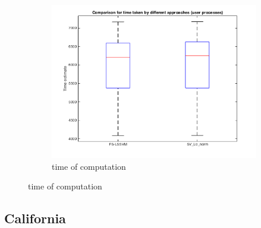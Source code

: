 \documentclass[11pt,oneside,a4paper]{article}
\begin{document}
\begin{figure}[H]
\begin{subfigure}[b]{0.4\textwidth}
		\includegraphics[width=\textwidth]{../Figures/time2}
		\caption{time of computation}
	\end{subfigure}
\end{figure}

\subsection{California}
\end{document}
